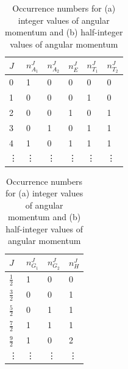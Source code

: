     
    \begin{table}
        \centering
        \begin{subtable}{.49\linewidth}
        \centering
        \begin{tabular}{l|l|l|l|l|l}
            $J$ & $n_{A_1}^J$ & $n_{A_2}^J$ & $n_{E}^J$ & $n_{T_1}^J$ & $n_{T_2}^J$\\
            \hline
            0 & 1 & 0 & 0 & 0 & 0\\
            1&0&0&0&1&0\\
            2&0&0&1&0&1\\
            3&0&1&0&1&1\\
            4&1&0&1&1&1\\
            \vdots & \vdots & \vdots & \vdots & \vdots & \vdots
        \end{tabular}
        \caption{}
        \label{table:O_occurrence_nums}
        \end{subtable}
        \begin{subtable}{.49\linewidth}
        \centering
        \begin{tabular}{l|l|l|l}
            $J$ & $n_{G_1}^J$ & $n_{G_2}^J$ & $n_{H}^J$ \\
            \hline
            $\frac{1}{2}$&1&0&0\\
            $\frac{3}{2}$&0&0&1\\
            $\frac{5}{2}$&0&1&1\\
            $\frac{7}{2}$&1&1&1\\
            $\frac{9}{2}$&1&0&2\\
            \vdots&\vdots&\vdots&\vdots
        \end{tabular}
        \caption{}
        \label{table:OD_occurrence_nums}
        \end{subtable}
        \caption{Occurrence numbers for (a) integer values of angular momentum and (b) half-integer values of angular momentum}
    \end{table}
    

